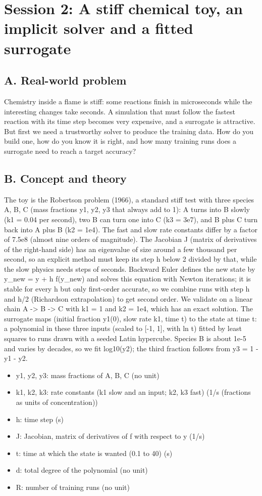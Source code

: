 \documentclass[11pt,a4paper]{article}
\begin{document}
\section{Session 2: A stiff chemical toy, an implicit solver and a fitted surrogate}

\subsection*{A. Real-world problem}
Chemistry inside a flame is stiff: some reactions finish in microseconds while the interesting changes take seconds. A simulation that must follow the fastest reaction with its time step becomes very expensive, and a surrogate is attractive. But first we need a trustworthy solver to produce the training data. How do you build one, how do you know it is right, and how many training runs does a surrogate need to reach a target accuracy?

\subsection*{B. Concept and theory}
The toy is the Robertson problem (1966), a standard stiff test with three species A, B, C (mass fractions y1, y2, y3 that always add to 1): A turns into B slowly (k1 = 0.04 per second), two B can turn one into C (k3 = 3e7), and B plus C turn back into A plus B (k2 = 1e4). The fast and slow rate constants differ by a factor of 7.5e8 (almost nine orders of magnitude). The Jacobian J (matrix of derivatives of the right-hand side) has an eigenvalue of size around a few thousand per second, so an explicit method must keep its step h below 2 divided by that, while the slow physics needs steps of seconds. Backward Euler defines the new state by y\_new = y + h f(y\_new) and solves this equation with Newton iterations; it is stable for every h but only first-order accurate, so we combine runs with step h and h/2 (Richardson extrapolation) to get second order. We validate on a linear chain A -\textgreater{} B -\textgreater{} C with k1 = 1 and k2 = 1e4, which has an exact solution. The surrogate maps (initial fraction y1(0), slow rate k1, time t) to the state at time t: a polynomial in these three inputs (scaled to [-1, 1], with ln t) fitted by least squares to runs drawn with a seeded Latin hypercube. Species B is about 1e-5 and varies by decades, so we fit log10(y2); the third fraction follows from y3 = 1 - y1 - y2.

\begin{itemize}[nosep]
\item y1, y2, y3: mass fractions of A, B, C (no unit)
\item k1, k2, k3: rate constants (k1 slow and an input; k2, k3 fast) (1/s (fractions as units of concentration))
\item h: time step (s)
\item J: Jacobian, matrix of derivatives of f with respect to y (1/s)
\item t: time at which the state is wanted (0.1 to 40) (s)
\item d: total degree of the polynomial (no unit)
\item R: number of training runs (no unit)
\end{itemize}
\end{document}
